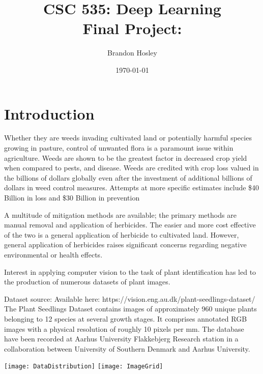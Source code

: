 \documentclass[]{article}
\title{CSC 535: Deep Learning \\ Final Project: \\ }
\author{Brandon Hosley}
\date{\today}
\begin{document}
	\maketitle
	\clearpage
	
\begin{abstract}
	
\end{abstract}
	
\section{Introduction} 

Whether they are weeds invading cultivated land or potentially harmful species growing in pasture, control of unwanted flora is a paramount issue within agriculture.
Weeds are shown to be the greatest factor in decreased crop yield when compared to pests, and disease.
\cite{Oerke2006}
\cite{Rao2000}
\cite{Gianessi2007}
Weeds are credited with crop loss valued in the billions of dollars globally even
 after the investment of additional billions of dollars in weed control measures.
\cite{WeedAnatomy2013}
Attempts at more specific estimates include 
\$40 Billion in loss \cite{Monaco2002}
and
\$30 Billion in prevention \cite{Lawes2008}

A multitude of mitigation methods are available; 
the primary methods are manual removal and application of herbicides.
The easier and more cost effective of the two is a general application of herbicide to cultivated land.
However, general application of herbicides raises significant concerns regarding negative environmental or health effects. 
\cite{Sopena2009}



Interest in applying computer vision to the task of plant identification has led to the production of numerous datasets of plant images.
\cite{Sudars2020}




Dataset source:
Available here: https://vision.eng.au.dk/plant-seedlings-dataset/
\cite{Giselsson2017}
The Plant Seedlings Dataset contains images of approximately 960 unique plants belonging to 12 species at several growth stages.
It comprises annotated RGB images with a physical resolution of roughly 10 pixels per mm.
The database have been recorded at Aarhus University Flakkebjerg Research station in a collaboration between University of Southern Denmark and Aarhus University.


\texttt{[image: DataDistribution]}
\texttt{[image: ImageGrid]}
\end{document}
